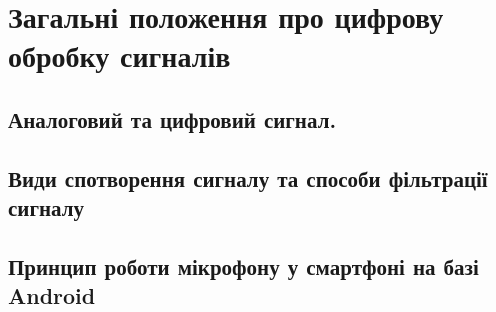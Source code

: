 \section{Загальні положення про цифрову обробку сигналів}

\subsection{Аналоговий та цифровий сигнал.}

\lipsum[2-4]

\subsection{Види спотворення сигналу та способи фільтрації сигналу}

\lipsum[1-4]

\subsection{Принцип роботи мікрофону у смартфоні на базі Android}

\lipsum[1-4]
